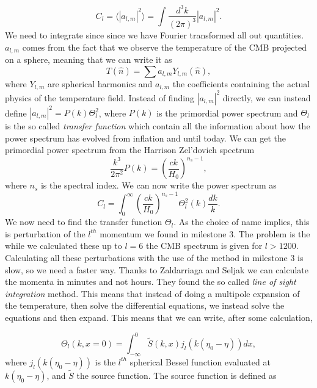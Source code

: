 \documentclass[a4paper,norsk, 10pt]{article}
\begin{document}
\begin{equation}
C_l = \langle |a_{l,m}|^2\rangle = \int \frac{d^3 k}{(2\pi)^3}|a_{l,m}|^2.
\end{equation}
We need to integrate since since we have Fourier transformed all out quantities. $a_{l,m}$ comes from the fact that we observe the temperature of the CMB projected on a sphere, meaning that we can write it as 
\begin{equation}
T(\hat{n}) = \sum a_{l,m} Y_{l,m}(\hat{n}),
\end{equation}
where $Y_{l,m}$ are spherical harmonics and $a_{l,m}$ the coefficients containing the actual physics of the temperature field. Instead of finding $|a_{l,m}|^2$ directly, we can instead define $|a_{l,m}|^2 = P(k)\Theta_l^2$, where $P(k)$ is the primordial power spectrum and $\Theta_l$ is the so called \textit{transfer function} which contain all the information about how the power spectrum has evolved from inflation and until today. We can get the primordial power spectrum from the Harrison Zel'dovich spectrum 
\begin{equation}\label{eq:P}
\frac{k^3}{2\pi^2}P(k) = \left(\frac{ck}{H_0}\right)^{n_s - 1},
\end{equation}
where $n_s$ is the spectral index. We can now write the power spectrum as
\begin{equation}\label{eq:Cl}
C_l = \int^{\infty}_{0}\left(\frac{ck}{H_0}\right)^{n_s - 1} \Theta_l^2(k) \frac{dk}{k}.
\end{equation}
We now need to find the transfer function $\Theta_l$. As the choice of name implies, this is perturbation of the $l^{th}$ momentum we found in milestone 3. The problem is the while we calculated these up to $l = 6$ the CMB spectrum is given for $l>1200$. Calculating all these perturbations with the use of the method in milestone 3 is slow, so we need a faster way. Thanks to Zaldarriaga and Seljak we can calculate the momenta in minutes and not hours. They found the so called \textit{line of sight integration} method. This means that instead of doing a multipole expansion of the temperature, then solve the differential equations, we instead solve the equations and then expand. This means that we can write, after some calculation,

\begin{equation}\label{eq:Theta}
\Theta_l(k,x=0) = \int_{-\infty}^{0} \tilde{S}(k,x)j_l(k(\eta_0 - \eta)) dx,
\end{equation}
where $j_l(k(\eta_0 - \eta))$ is the $l^{th}$ spherical Bessel function evaluated at $k(\eta_0 - \eta)$, and $\tilde{S}$ the source function. The source function is defined as
\end{document}
